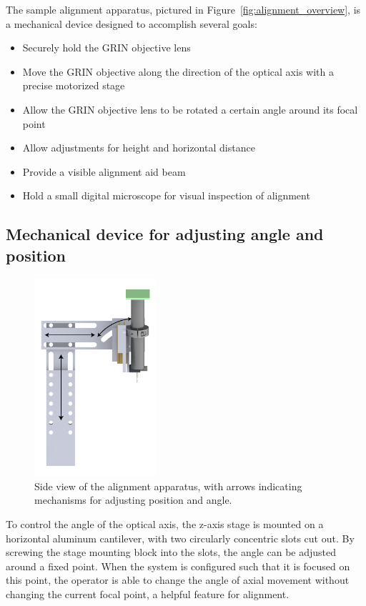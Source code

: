 The sample alignment apparatus, pictured in Figure~\ref{fig:alignment_overview}, is a mechanical device designed to accomplish several goals:

\begin{itemize}
	\item Securely hold the GRIN objective lens
	\item Move the GRIN objective along the direction of the optical axis with a precise motorized stage
	\item Allow the GRIN objective lens to be rotated a certain angle around its focal point
	\item Allow adjustments for height and horizontal distance
	\item Provide a visible alignment aid beam
	\item Hold a small digital microscope for visual inspection of alignment
\end{itemize}

\subsection{Mechanical device for adjusting angle and position}

\begin{figure}[h!]
\centering
\includegraphics[width=0.4\textwidth]{Images/System/angle_a.png}
\caption[Side view of the alignment apparatus.]{Side view of the alignment apparatus, with arrows indicating mechanisms for adjusting position and angle.}
\end{figure}

To control the angle of the optical axis, the z-axis stage is mounted on a horizontal aluminum cantilever, with two circularly concentric slots cut out. By screwing the stage mounting block into the slots, the angle can be adjusted around a fixed point. When the system is configured such that it is focused on this point, the operator is able to change the angle of axial movement without changing the current focal point, a helpful feature for alignment.

